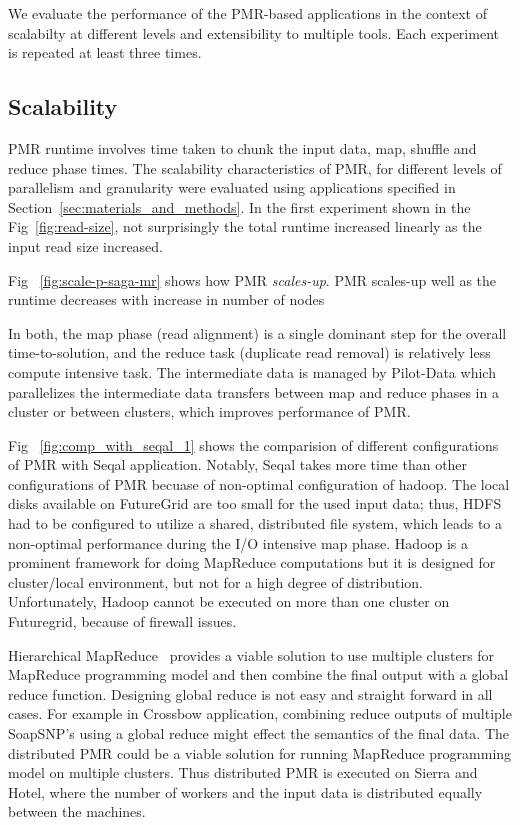 \documentclass{acm_proc_article-sp}
\begin{document}
We evaluate the performance of the PMR-based applications in the
context of scalabilty at different levels and extensibility to
multiple tools.  Each experiment is repeated at least three times.

\subsection{Scalability}

PMR runtime involves time taken to chunk the input data, map, shuffle
and reduce phase times.  The scalability characteristics of PMR, for
different levels of parallelism and granularity were evaluated using
applications specified in Section~\ref{sec:materials_and_methods}.  In
the first experiment shown in the Fig~\ref{fig:read-size}, not
surprisingly the total runtime increased linearly as the input read
size increased.


Fig ~\ref{fig:scale-p-saga-mr} shows how PMR \textit{scales-up}. PMR
scales-up well as the runtime decreases with increase in number of
nodes 

In both, the map phase (read alignment) is a single dominant step for
the overall time-to-solution, and the reduce task (duplicate read
removal) is relatively less compute intensive task. The intermediate
data is managed by Pilot-Data which parallelizes the intermediate data
transfers between map and reduce phases in a cluster or between
clusters, which improves performance of PMR.

Fig ~\ref{fig:comp_with_seqal_1} shows the comparision of different
configurations of PMR with Seqal application.  Notably, Seqal takes
more time than other configurations of PMR becuase of non-optimal
configuration of hadoop.  The local disks available on FutureGrid are
too small for the used input data; thus, HDFS had to be configured to
utilize a shared, distributed file system, which leads to a
non-optimal performance during the I/O intensive map phase. Hadoop is
a prominent framework for doing MapReduce computations but it is
designed for cluster/local environment, but not for a high degree of
distribution. Unfortunately, Hadoop cannot be executed on more than
one cluster on Futuregrid, because of firewall issues.

Hierarchical MapReduce~\cite{ecmls11-mr-autodock} provides a viable
solution to use multiple clusters for MapReduce programming model and
then combine the final output with a global reduce function. Designing
global reduce is not easy and straight forward in all cases. For
example in Crossbow application, combining reduce outputs of multiple
SoapSNP's using a global reduce might effect the semantics of the
final data. The distributed PMR could be a viable solution for running
MapReduce programming model on multiple clusters. Thus distributed PMR
is executed on Sierra and Hotel, where the number of workers and the
input data is distributed equally between the machines.
\end{document}
